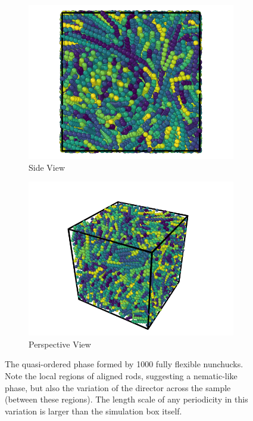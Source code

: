 \documentclass[11pt, a4paper]{article} %
\begin{document}
\begin{figure}
	\centering
	\begin{subfigure}{.5\textwidth}
		\centering
		\includegraphics[width=.9\linewidth]{Figures/nun_fr_side}
		\caption{Side View}
		\label{fig:nun_fr_side}
	\end{subfigure}%
	\begin{subfigure}{.5\textwidth}
		\centering
		\includegraphics[width=.9\linewidth]{Figures/nun_fr_perspective}
		\caption{Perspective View}
		\label{fig:nun_fr_perspective}
	\end{subfigure}
	\caption{The quasi-ordered phase formed by \num{1000} fully flexible nunchucks. Note the local regions of aligned rods, suggesting a nematic-like phase, but also the variation of the director across the sample (between these regions). The length scale of any periodicity in this variation is larger than the simulation box itself.}
	\label{fig:nun_fr_views}
\end{figure} %
\end{document}

